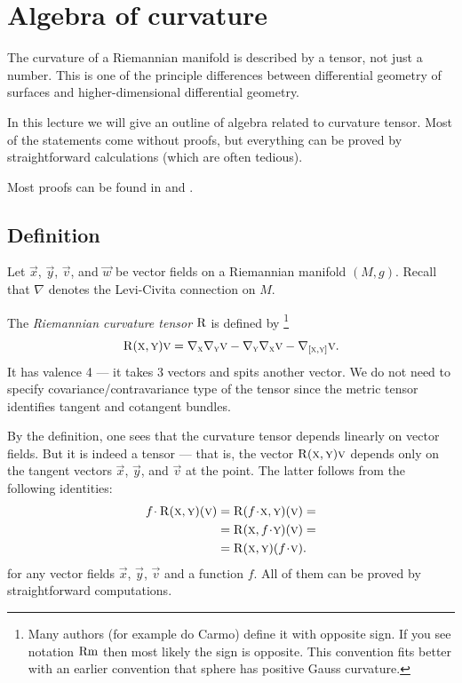 \chapter{Algebra of curvature}

The curvature of a Riemannian manifold is described by a tensor, not just a number.
This is one of the principle differences between differential geometry of surfaces and higher-dimensional differential geometry.

In this lecture we will give an outline of algebra related to curvature tensor.
Most of the statements come without proofs, but everything can be proved by straightforward calculations (which are often tedious).

Most proofs can be found in \cite[Chapters 4+6]{do-carmo} and \cite[Chapter 3]{cheeger-ebin}.

\section{Definition}
Let $\vec x$, $\vec y$, $\vec v$, and $\vec w$ be vector fields on a Riemannian manifold $(M,g)$.
Recall that $\nabla$ denotes the Levi-Civita connection on $M$.

The \emph{Riemannian curvature tensor} $\operatorname{\rm R}\nolimits$ is defined by%
\footnote{Many authors (for example do Carmo) define it with opposite sign.
If you see notation $\mathop{\rm Rm}$ then most likely the sign is opposite.
This convention fits better with an earlier convention that sphere has positive Gauss curvature.}
\[\operatorname{\rm R}\nolimits(\textsc x,\textsc y)\textsc v
=
\nabla_{\textsc x}\nabla_{\textsc y}\textsc v
-\nabla_{\textsc y}\nabla_{\textsc x}\textsc v
-\nabla_{[\textsc x,\textsc y]}\textsc v.\]
It has valence 4 ---
it takes 3 vectors and spits another vector.
We do not need to specify covariance/contravariance type of the tensor since 
the metric tensor identifies tangent and cotangent bundles.

By the definition, one sees that the curvature tensor depends linearly on vector fields.
But it is indeed a tensor --- that is,  the vector $\operatorname{\rm R}\nolimits(\textsc x,\textsc y)\textsc v$ depends only on the tangent vectors $\vec x$, $\vec y$, and $\vec v$ at the point.
The latter follows from the following identities: 
\begin{align*}
f\cdot \Rm(\vec x,\vec y)(\vec v)&=\Rm(f\cdot \vec x,\vec y)(\vec v)=
\\
&=\Rm(\vec x,f\cdot \vec y)(\vec v)=
 \\
&=\Rm(\vec x,\vec y)(f\cdot \vec v).
\end{align*}
for any vector fields $\vec x$, $\vec y$, $\vec v$ and a function $f$.
All of them can be proved by straightforward computations.

